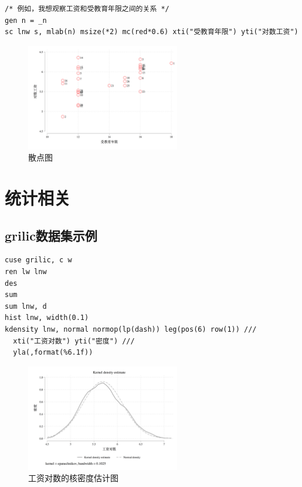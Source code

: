 \documentclass[]{ctexbook}
\begin{document}
\begin{lstlisting}
/* 例如，我想观察工资和受教育年限之间的关系 */
gen n = _n
sc lnw s, mlab(n) msize(*2) mc(red*0.6) xti("受教育年限") yti("对数工资")
\end{lstlisting}

\begin{figure}

{\centering \includegraphics[width=0.6\textwidth]{assets/scatter} 

}

\caption{散点图}\label{fig:scatter}
\end{figure}

\hypertarget{section-18}{%
\section{统计相关}\label{section-18}}

\hypertarget{grilic}{%
\subsection{grilic数据集示例}\label{grilic}}

\begin{lstlisting}
cuse grilic, c w
ren lw lnw
des
sum
sum lnw, d
hist lnw, width(0.1)
kdensity lnw, normal normop(lp(dash)) leg(pos(6) row(1)) ///
  xti("工资对数") yti("密度") ///
  yla(,format(%6.1f))
\end{lstlisting}

\begin{figure}

{\centering \includegraphics[width=0.6\textwidth]{assets/kden} 

}

\caption{工资对数的核密度估计图}\label{fig:kden}
\end{figure}
\end{document}
